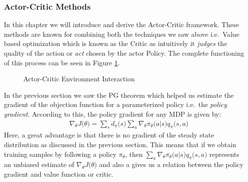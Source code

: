 \documentclass[12pt]{extarticle}
\numberwithin{equation}{section}
\begin{document}
	\subsubsection{Actor-Critic Methods}\label{section:ac-methods}
	In this chapter we will introduce and derive the Actor-Critic framework. These methods are known for combining both the techniques we saw above i.e.\ Value based optimization which is known as the Critic as intuitively it \textit{judges} the quality of the action or \textit{act} chosen by the actor Policy. The complete functioning of this process can be seen in Figure \ref{a-c}. 
	\begin{figure}[h]
		\centering
		\setlength{\fboxsep}{5pt}%
		\setlength{\fboxrule}{1pt}%
		\caption{Actor-Critic Environment Interaction
			\label{a-c}}
	\end{figure}
	In the previous section we saw the PG theorem\cite{Sutton-introRL}\cite{Sutton_pg} which helped us estimate the gradient of the objection function for a parameterized policy i.e.\ the \textit{policy gradient}. According to this, the policy gradient for any MDP is given by:
	\begin{align}
	&\nabla_{\theta}J\big(\theta\big) =  \sum_{s}d_{\pi}\big(s\big)\sum_{a}\nabla_{\theta} \pi_{\theta}\big(a|s\big)q_{\pi}\big(s,a\big) \label{eq:pg-theorem}
	\end{align}
	Here, a great advantage is that there is no gradient of the steady state distribution as discussed in the previous section. This means that if we obtain training samples by following a policy $\pi_{\theta}$, then $\sum_{a}\nabla_{\theta} \pi_{\theta}\big(a|s\big)q_{\pi}\big(s,a\big)$  represents an unbiased estimate of $\nabla_{\theta}J\big(\theta\big)$ and also a gives us a relation between the policy gradient and value function or critic. 
\end{document}
